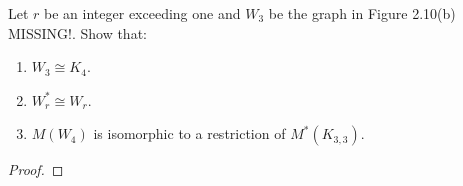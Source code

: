 \prob
{
    Let $r$ be an integer exceeding one and $W_3$ be the graph in Figure 2.10(b) MISSING!. Show that:
    \begin{enumerate}[label=(\roman*)]
        \item $W_3 \cong K_4$.
        \item $W_r^* \cong W_r$.
        \item $M(W_4)$ is isomorphic to a restriction of $M^*(K_{3,3})$.
    \end{enumerate}
}
\begin{proof}
\end{proof}
